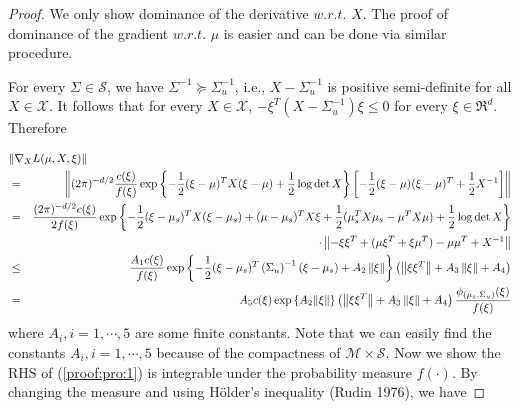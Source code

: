 \begin{proof}
We only show dominance of the derivative $w.r.t.$ $X$. The proof of
dominance of the gradient $w.r.t.$ $\mu$ is easier and can be done
via similar procedure.

For every $\Sigma\in \mathcal S$, we have
$\Sigma^{-1}\succeq\Sigma_u^{-1}$, i.e., $X-\Sigma_u^{-1}$ is
positive semi-definite for all $X\in \mathcal{X}$. It follows that
for every $X\in \mathcal{X}$, $-\xi^T(X- \Sigma_u^{-1})\xi\le 0$ for
every $\xi\in \Re^d$. Therefore

{\footnotesize{
\begin{eqnarray}
\lefteqn{\left\|\nabla_X
L(\mu,X,\xi)\right\|}\nonumber\\
&=&\left\|(2\pi)^{-d/2}{c(\xi)\over f(\xi)}\exp\left\{-{1\over
2}(\xi-\mu)^T X(\xi-\mu)+{1\over 2}\log\det
X\right\}\left[-\frac{1}{2}(\xi-\mu)(\xi-\mu)^T+\frac{1}{2}X^{-1}
\right]\right\|\nonumber\\
&=& {(2\pi)^{-d/2}c(\xi)\over 2f(\xi)}\exp\left\{-{1\over
2}(\xi-\mu_s)^T
X(\xi-\mu_s)+(\mu-\mu_s)^TX\xi+\frac{1}{2}(\mu_s^TX\mu_s-\mu^TX\mu)+
{1\over 2}\log\det X\right\}\nonumber\\
&&\cdot\left\|-\xi\xi^T+
(\mu\xi^T+\xi\mu^T)-\mu\mu^T+X^{-1}\right\|\nonumber\\
&\le& \frac{A_1c(\xi)}{f(\xi)}\exp\left\{-{1\over2}(\xi-\mu_s)^T
\left(\Sigma_u\right)^{-1}(\xi-\mu_s)+
A_2\left\|\xi\right\|\right\}\left(\left\|
\xi\xi^T\right\|+A_3\left\|\xi\right\|+A_4\right)\nonumber\\
&=& A_5c(\xi)\exp{\left\{A_2\|\xi\|\right\}}\left(\left\|
\xi\xi^T\right\|+A_3\left\|\xi\right\|+A_4\right)\frac{\phi_{(\mu_s,
\Sigma_u)}(\xi)}{f(\xi)}\label{proof:pro:1}
\end{eqnarray}
}}where $A_i, i=1,\cdots, 5$ are some finite constants. Note that we
can easily find the constants $A_i, i=1,\cdots, 5$ because of the
compactness of $\mathcal{M}\times \mathcal{S}$. Now we show the RHS
of (\ref{proof:pro:1}) is integrable under the probability measure
$f(\cdot)$. By changing the measure and using H\"{o}lder's
inequality (Rudin 1976), we have


\end{proof}
